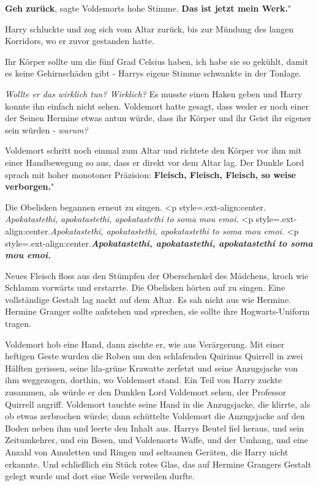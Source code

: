 \glqq{}\textbf{Geh zurück}\grqq{}, sagte Voldemorts hohe Stimme. \glqq
\textbf{Das ist jetzt mein Werk.}"

Harry schluckte und zog sich vom Altar zurück, bis zur Mündung des langen
Korridors, wo er zuvor gestanden hatte.

\glqq{}Ihr Körper sollte um die fünf Grad Celsius haben, ich habe sie so gekühlt,
damit es keine Gehirnschäden gibt -\grqq{} Harrys eigene Stimme schwankte in der
Tonlage.

\emph{Wollte er das wirklich tun? Wirklich?}
Es musste einen Haken geben und Harry konnte ihn einfach nicht sehen. Voldemort
hatte gesagt, dass weder er noch einer der Seinen Hermine etwas antun würde,
dass ihr Körper und ihr Geist ihr eigener sein würden - \emph{warum?}

Voldemort schritt noch einmal zum Altar und richtete den Körper vor ihm mit
einer Handbewegung so aus, dass er direkt vor dem Altar lag. Der Dunkle Lord
sprach mit hoher monotoner Präzision: \glqq{}\textbf{Fleisch, Fleisch, Fleisch,
so weise verborgen.}"

Die Obelisken begannen erneut zu singen. <p
style=\grqq{}.ext-align:center\grqq{}. \emph{Apokatastethi, apokatastethi,
apokatastethi to soma mou emoi.}   <p
style=\grqq{}.ext-align:center\grqq{}.\emph{Apokatastethi, apokatastethi,
apokatastethi to soma mou emoi.}   <p
style=\grqq{}.ext-align:center\grqq{}.\textbf{\emph{Apokatastethi,
apokatastethi, apokatastethi to soma mou emoi.} }

Neues Fleisch floss aus den Stümpfen der Oberschenkel des Mädchens, kroch wie
Schlamm vorwärts und erstarrte. Die Obelisken hörten auf zu singen. Eine
vollständige Gestalt lag nackt auf dem Altar. Es sah nicht aus wie Hermine.
Hermine Granger sollte aufstehen und sprechen, sie sollte ihre Hogwarts-Uniform
tragen.

Voldemort hob eine Hand, dann zischte er, wie aus Verärgerung. Mit einer
heftigen Geste wurden die Roben um den schlafenden Quirinus Quirrell in zwei
Hälften gerissen, seine lila-grüne Krawatte zerfetzt und seine Anzugsjacke von
ihm weggezogen, dorthin, wo Voldemort stand. Ein Teil von Harry zuckte zusammen,
als würde er den Dunklen Lord Voldemort sehen, der Professor Quirrell angriff.
Voldemort tauchte seine Hand in die Anzugsjacke, die klirrte, als ob etwas
zerbrochen würde; dann schüttelte Voldemort die Anzugsjacke auf den Boden neben
ihm und leerte den Inhalt aus. Harrys Beutel fiel heraus, und sein Zeitumkehrer,
und ein Besen, und Voldemorts Waffe, und der Umhang, und eine Anzahl von
Amuletten und Ringen und seltsamen Geräten, die Harry nicht erkannte. Und
schließlich ein Stück rotes Glas, das auf Hermine Grangers Gestalt gelegt wurde
und dort eine Weile verweilen durfte.

